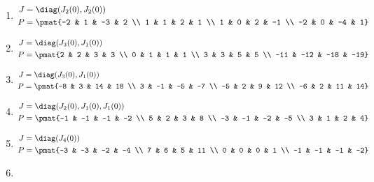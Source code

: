 \begin{enumerate}
\item

\begin{align*}
J &= \diag(J_{2}(0), J_{2}(0))\\
P &= \pmat{-2 & 1 & -3 & 2 \\ 1 & 1 & 2 & 1 \\ 1 & 0 & 2 & -1 \\ -2 & 0 & -4 & 1}
\end{align*}

\item

\begin{align*}
J &= \diag(J_{3}(0), J_{1}(0))\\
P &= \pmat{2 & 2 & 3 & 3 \\ 0 & 1 & 1 & 1 \\ 3 & 3 & 5 & 5 \\ -11 & -12 & -18 & -19}
\end{align*}

\item

\begin{align*}
J &= \diag(J_{3}(0), J_{1}(0))\\
P &= \pmat{-8 & 3 & 14 & 18 \\ 3 & -1 & -5 & -7 \\ -5 & 2 & 9 & 12 \\ -6 & 2 & 11 & 14}
\end{align*}

\item

\begin{align*}
J &= \diag(J_{2}(0), J_{1}(0), J_{1}(0))\\
P &= \pmat{-1 & -1 & -1 & -2 \\ 5 & 2 & 3 & 8 \\ -3 & -1 & -2 & -5 \\ 3 & 1 & 2 & 4}
\end{align*}

\item

\begin{align*}
J &= \diag(J_{4}(0))\\
P &= \pmat{-3 & -3 & -2 & -4 \\ 7 & 6 & 5 & 11 \\ 0 & 0 & 0 & 1 \\ -1 & -1 & -1 & -2}
\end{align*}

\item


\end{enumerate}
